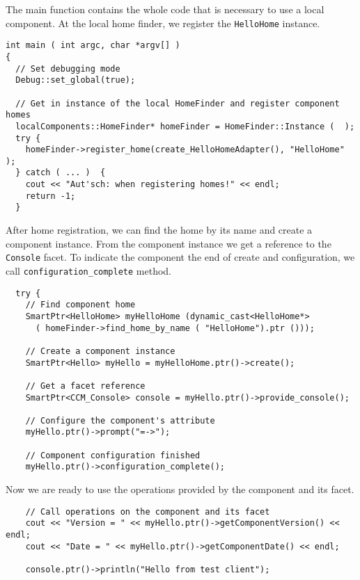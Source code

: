 \noindent
The main function contains the whole code that is necessary to use a local
component. At the local home finder, we register the {\tt HelloHome} instance.
\begin{small}
\begin{verbatim}
int main ( int argc, char *argv[] )
{
  // Set debugging mode
  Debug::set_global(true);

  // Get in instance of the local HomeFinder and register component homes
  localComponents::HomeFinder* homeFinder = HomeFinder::Instance (  );
  try {                       
    homeFinder->register_home(create_HelloHomeAdapter(), "HelloHome" );
  } catch ( ... )  {
    cout << "Aut'sch: when registering homes!" << endl;
    return -1;
  }
\end{verbatim}
\end{small}

\noindent
After home registration, we can find the home by its name and create a component
instance. From the component instance we get a reference to the {\tt Console}
facet. To indicate the component the end of create and configuration, we call
{\tt configuration\_complete} method.
\begin{small}
\begin{verbatim}
  try {
    // Find component home
    SmartPtr<HelloHome> myHelloHome (dynamic_cast<HelloHome*>
      ( homeFinder->find_home_by_name ( "HelloHome").ptr ()));

    // Create a component instance
    SmartPtr<Hello> myHello = myHelloHome.ptr()->create();
  
    // Get a facet reference
    SmartPtr<CCM_Console> console = myHello.ptr()->provide_console();

    // Configure the component's attribute
    myHello.ptr()->prompt("=->");

    // Component configuration finished
    myHello.ptr()->configuration_complete();
\end{verbatim}
\end{small}

\noindent
Now we are ready to use the operations provided by the component and its facet.
\begin{small}
\begin{verbatim}    
    // Call operations on the component and its facet
    cout << "Version = " << myHello.ptr()->getComponentVersion() << endl;
    cout << "Date = " << myHello.ptr()->getComponentDate() << endl;
	
    console.ptr()->println("Hello from test client");
\end{verbatim}
\end{small}


